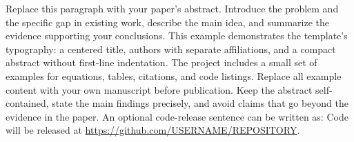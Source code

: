 Replace this paragraph with your paper's abstract. Introduce the problem and the
specific gap in existing work, describe the main idea, and summarize the evidence
supporting your conclusions. This example demonstrates the template's typography:
a centered title, authors with separate affiliations, and a compact abstract
without first-line indentation. The project includes a small set of examples for
equations, tables, citations, and code listings. Replace all example content with
your own manuscript before publication. Keep the abstract self-contained, state
the main findings precisely, and avoid claims that go beyond the evidence in the
paper. An optional code-release sentence can be written as:
Code will be released at \url{https://github.com/USERNAME/REPOSITORY}.
